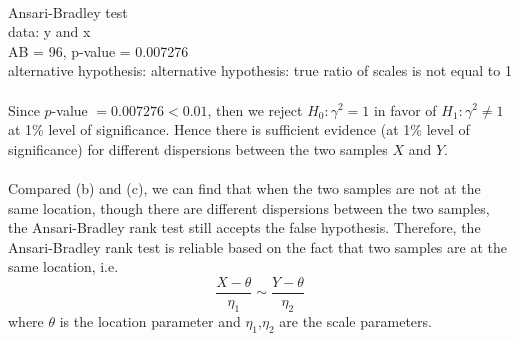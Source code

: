 \documentclass[12pt,a4paper]{article}
\begin{document}
~\\
\indent\indent\indent\indent\indent\indent Ansari-Bradley test\\
\indent data: y and x\\
\indent AB = 96, p-value = 0.007276\\
\indent alternative hypothesis: alternative hypothesis: true ratio of scales is not \indent equal to 1\\
~\\
Since $p$-value $=0.007276<0.01$, then we reject $H_{0}:\gamma^{2} =1$ in favor of $H_{1}:\gamma^{2}\neq 1$ at 1\% level of significance. Hence there is sufficient evidence (at 1\% level of significance) for different dispersions between the two samples $X$ and $Y$.\\
~\\
Compared (b) and (c), we can find that when the two samples are not at the same location, though there are different dispersions between the two samples, the Ansari-Bradley rank test still accepts the false hypothesis. Therefore, the Ansari-Bradley rank test is reliable based on the fact that two samples are at the same location, i.e.
$$\dfrac{X-\theta}{\eta_{1}}\sim\dfrac{Y-\theta}{\eta_{2}}$$
where $\theta$ is the location parameter and $\eta_{1}$,$\eta_{2}$ are the scale parameters.
\end{document}
